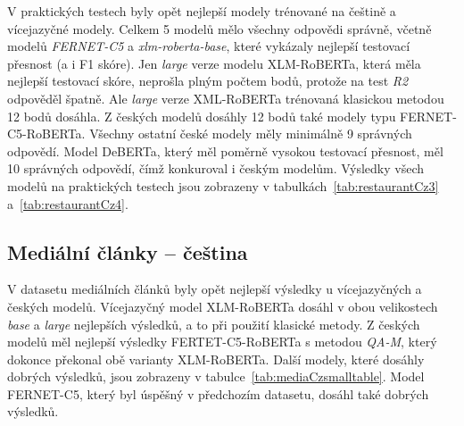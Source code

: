 V praktických testech byly opět nejlepší modely trénované na češtině a vícejazyčné modely. Celkem 5 modelů mělo všechny odpovědi správně, včetně modelů \emph{FERNET-C5} a \emph{xlm-roberta-base}, které vykázaly nejlepší testovací přesnost (a i F1 skóre). Jen \emph{large} verze modelu XLM-RoBERTa, která měla nejlepší testovací skóre, neprošla plným počtem bodů, protože na test \emph{R2} odpověděl špatně. Ale \emph{large} verze XML-RoBERTa trénovaná klasickou metodou 12 bodů dosáhla. Z českých modelů dosáhly 12 bodů také modely typu FERNET-C5-RoBERTa. Všechny ostatní české modely měly minimálně 9 správných odpovědí. Model DeBERTa, který měl poměrně vysokou testovací přesnost, měl 10 správných odpovědí, čímž konkuroval i českým modelům. Výsledky všech modelů na praktických testech jsou zobrazeny v tabulkách~\ref{tab:restaurantCz3} a~\ref{tab:restaurantCz4}.

\subsection{Mediální články -- čeština}\label{MedVys}
V datasetu mediálních článků byly opět nejlepší výsledky u vícejazyčných a českých modelů. Vícejazyčný model XLM-RoBERTa dosáhl v obou velikostech \emph{base} a \emph{large} nejlepších výsledků, a to při použití klasické metody. Z českých modelů měl nejlepší výsledky FERTET-C5-RoBERTa s metodou \emph{QA-M}, který dokonce překonal obě varianty XLM-RoBERTa. Další modely, které dosáhly dobrých výsledků, jsou zobrazeny v tabulce~\ref{tab:mediaCzsmalltable}. Model FERNET-C5, který byl úspěšný v předchozím datasetu, dosáhl také dobrých výsledků.

